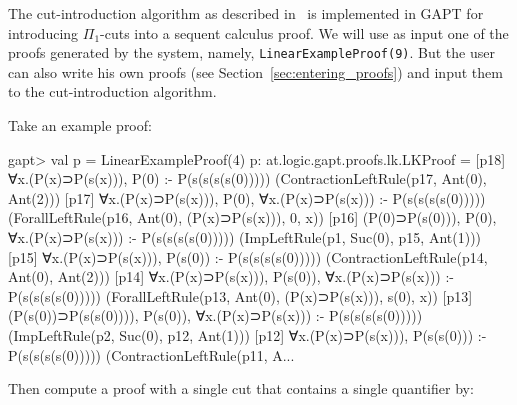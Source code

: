 \documentclass[a4paper,11pt]{article}
\begin{document}
The cut-introduction algorithm as described in~\cite{Hetzl2012,Hetzl14Algorithmic,Hetzl14Introducing} is
implemented in GAPT for introducing $\Pi_1$-cuts into a sequent calculus
proof. We will use as input one of the proofs generated by
the system, namely, \texttt{LinearExampleProof(9)}. But the user can also
write his own proofs (see Section~\ref{sec:entering_proofs})
and input them to the cut-introduction algorithm.

Take an example proof:
\begin{clilisting}
gapt> val p = LinearExampleProof(4)
p: at.logic.gapt.proofs.lk.LKProof =
[p18] ∀x.(P(x)⊃P(s(x))), P(0) :- P(s(s(s(s(0)))))    (ContractionLeftRule(p17, Ant(0), Ant(2)))
[p17] ∀x.(P(x)⊃P(s(x))), P(0), ∀x.(P(x)⊃P(s(x))) :- P(s(s(s(s(0)))))    (ForallLeftRule(p16, Ant(0), (P(x)⊃P(s(x))), 0, x))
[p16] (P(0)⊃P(s(0))), P(0), ∀x.(P(x)⊃P(s(x))) :- P(s(s(s(s(0)))))    (ImpLeftRule(p1, Suc(0), p15, Ant(1)))
[p15] ∀x.(P(x)⊃P(s(x))), P(s(0)) :- P(s(s(s(s(0)))))    (ContractionLeftRule(p14, Ant(0), Ant(2)))
[p14] ∀x.(P(x)⊃P(s(x))), P(s(0)), ∀x.(P(x)⊃P(s(x))) :- P(s(s(s(s(0)))))    (ForallLeftRule(p13, Ant(0), (P(x)⊃P(s(x))), s(0), x))
[p13] (P(s(0))⊃P(s(s(0)))), P(s(0)), ∀x.(P(x)⊃P(s(x))) :- P(s(s(s(s(0)))))    (ImpLeftRule(p2, Suc(0), p12, Ant(1)))
[p12] ∀x.(P(x)⊃P(s(x))), P(s(s(0))) :- P(s(s(s(s(0)))))    (ContractionLeftRule(p11, A...
\end{clilisting}
Then compute a proof with a single cut that contains a single quantifier by:
\end{document}
